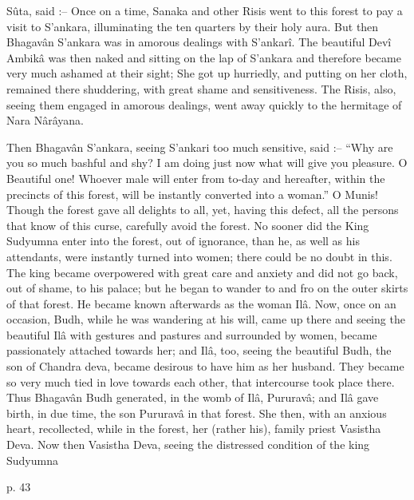  

Sûta, said :-- Once on a time, Sanaka and other Risis went to this forest to pay a visit to S'ankara, illuminating the ten quarters by their holy aura. But then Bhagavân S'ankara was in amorous dealings with S'ankarî. The beautiful Devî Ambikâ was then naked and sitting on the lap of S'ankara and therefore became very much ashamed at their sight; She got up hurriedly, and putting on her cloth, remained there shuddering, with great shame and sensitiveness. The Risis, also, seeing them engaged in amorous dealings, went away quickly to the hermitage of Nara Nârâyana.

 

Then Bhagavân S'ankara, seeing S'ankari too much sensitive, said :-- “Why are you so much bashful and shy? I am doing just now what will give you pleasure. O Beautiful one! Whoever male will enter from to-day and hereafter, within the precincts of this forest, will be instantly converted into a woman.” O Munis! Though the forest gave all delights to all, yet, having this defect, all the persons that know of this curse, carefully avoid the forest. No sooner did the King Sudyumna enter into the forest, out of ignorance, than he, as well as his attendants, were instantly turned into women; there could be no doubt in this. The king became overpowered with great care and anxiety and did not go back, out of shame, to his palace; but he began to wander to and fro on the outer skirts of that forest. He became known afterwards as the woman Ilâ. Now, once on an occasion, Budh, while he was wandering at his will, came up there and seeing the beautiful Ilâ with gestures and pastures and surrounded by women, became passionately attached towards her; and Ilâ, too, seeing the beautiful Budh, the son of Chandra deva, became desirous to have him as her husband. They became so very much tied in love towards each other, that intercourse took place there. Thus Bhagavân Budh generated, in the womb of Ilâ, Pururavâ; and Ilâ gave birth, in due time, the son Pururavâ in that forest. She then, with an anxious heart, recollected, while in the forest, her (rather his), family priest Vasistha Deva. Now then Vasistha Deva, seeing the distressed condition of the king Sudyumna

 

p. 43

 

